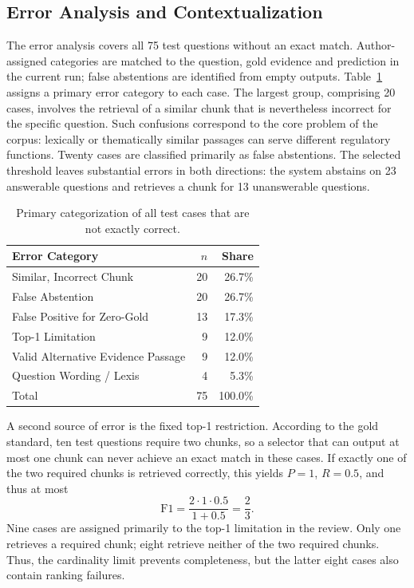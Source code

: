 \documentclass[11pt]{article}
\begin{document}
\subsection{Error Analysis and Contextualization}
\label{sec:error-analysis}

The error analysis covers all 75 test questions without an exact match. Author-assigned categories are matched to the question, gold evidence and prediction in the current run; false abstentions are identified from empty outputs. Table~\ref{tab:error-analysis} assigns a primary error category to each case. The largest group, comprising 20 cases, involves the retrieval of a similar chunk that is nevertheless incorrect for the specific question. Such confusions correspond to the core problem of the corpus: lexically or thematically similar passages can serve different regulatory functions. Twenty cases are classified primarily as false abstentions. The selected threshold leaves substantial errors in both directions: the system abstains on 23 answerable questions and retrieves a chunk for 13 unanswerable questions.

\begin{table}[t]
\centering
\small
\begin{tabular}{lrr}
\toprule
\textbf{Error Category} & \textbf{$n$} & \textbf{Share} \\
\midrule
Similar, Incorrect Chunk & 20 & 26.7\% \\
False Abstention & 20 & 26.7\% \\
False Positive for Zero-Gold & 13 & 17.3\% \\
Top-1 Limitation & 9 & 12.0\% \\
Valid Alternative Evidence Passage & 9 & 12.0\% \\
Question Wording / Lexis & 4 & 5.3\% \\
\midrule
Total & 75 & 100.0\% \\
\bottomrule
\end{tabular}
\caption{Primary categorization of all test cases that are not exactly correct.}
\label{tab:error-analysis}
\end{table}

A second source of error is the fixed top-1 restriction. According to the gold standard, ten test questions require two chunks, so a selector that can output at most one chunk can never achieve an exact match in these cases. If exactly one of the two required chunks is retrieved correctly, this yields $P=1$, $R=0.5$, and thus at most
\begin{equation}
\mathrm{F1}=\frac{2\cdot1\cdot0.5}{1+0.5}=\frac{2}{3}.
\end{equation}
Nine cases are assigned primarily to the top-1 limitation in the review. Only one retrieves a required chunk; eight retrieve neither of the two required chunks. Thus, the cardinality limit prevents completeness, but the latter eight cases also contain ranking failures.
\end{document}

